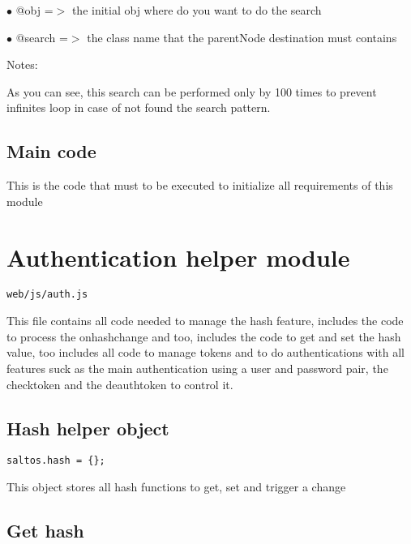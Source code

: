 \documentclass[a4paper]{book}
\begin{document}
\begin{compactitem}
\item[\color{myblue}$\bullet$] @obj    =$>$ the initial obj where do you want to do the search
\item[\color{myblue}$\bullet$] @search =$>$ the class name that the parentNode destination must contains
\end{compactitem}

Notes:

As you can see, this search can be performed only by 100 times to prevent infinites loop
in case of not found the search pattern.

\hypertarget{toc425}{}
\subsection{Main code}

This is the code that must to be executed to initialize all requirements of this module

\hypertarget{toc426}{}
\section{Authentication helper module}

\begin{lstlisting}
web/js/auth.js
\end{lstlisting}

This file contains all code needed to manage the hash feature, includes the code to
process the onhashchange and too, includes the code to get and set the hash value, too
includes all code to manage tokens and to do authentications with all features suck as
the main authentication using a user and password pair, the checktoken and the deauthtoken
to control it.

\hypertarget{toc427}{}
\subsection{Hash helper object}

\begin{lstlisting}
saltos.hash = {};
\end{lstlisting}

This object stores all hash functions to get, set and trigger a change

\hypertarget{toc428}{}
\subsection{Get hash}
\end{document}
